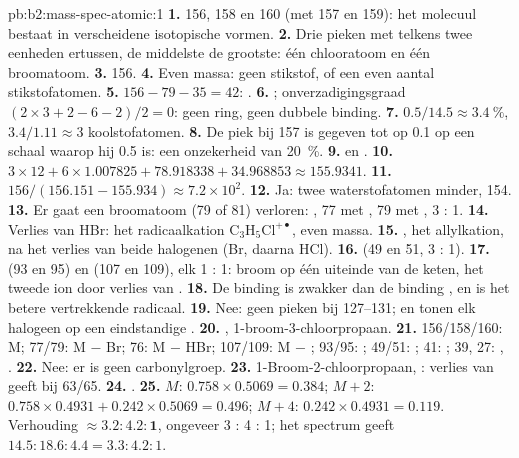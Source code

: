 \begin{solution}{pb:b2:mass-spec-atomic:1}
\textbf{1.} 156, 158 en 160 (met 157 en 159): het molecuul bestaat in verscheidene isotopische vormen.
\textbf{2.} Drie pieken met telkens twee eenheden ertussen, de middelste de grootste: één chlooratoom en één broomatoom.
\textbf{3.} 156.
\textbf{4.} Even massa: geen stikstof, of een even aantal stikstofatomen.
\textbf{5.} $156 - 79 - 35 = 42$: .
\textbf{6.} ; onverzadigingsgraad $(2 \times 3 + 2 - 6 - 2)/2 = 0$: geen ring, geen dubbele
binding.
\textbf{7.} $0.5/14.5 \approx 3.4~\%$, $3.4/1.11 \approx 3$ koolstofatomen.
\textbf{8.} De piek bij 157 is gegeven tot op 0.1 op een schaal waarop hij 0.5 is: een onzekerheid van 20~\%.
\textbf{9.}  en .
\textbf{10.} $3 \times 12 + 6 \times 1.007825 + 78.918338 + 34.968853 \approx 155.9341$.
\textbf{11.} $156/(156.151 - 155.934) \approx 7.2 \times 10^2$.
\textbf{12.} Ja: twee waterstofatomen minder, 154.
\textbf{13.} Er gaat een broomatoom (79 of 81) verloren: , 77 met , 79 met ,
3 : 1.
\textbf{14.} Verlies van HBr: het radicaalkation $\mathrm{C_3H_5Cl^{+\bullet}}$, even massa.
\textbf{15.} , het allylkation, na het verlies van beide halogenen (Br, daarna HCl).
\textbf{16.}  (49 en 51, 3 : 1).
\textbf{17.}  (93 en 95) en  (107 en 109), elk 1 : 1: broom op één uiteinde van
de keten, het tweede ion door verlies van .
\textbf{18.} De binding  is zwakker dan de binding , en  is het betere vertrekkende
radicaal.
\textbf{19.} Nee: geen pieken bij 127--131;  en  tonen elk halogeen op een eindstandige
.
\textbf{20.} , 1-broom-3-chloorpropaan.
\textbf{21.} 156/158/160: M; 77/79: M $-$ Br; 76: M $-$ HBr; 107/109: M $-$ ;
93/95: ; 49/51: ; 41: ; 39, 27: , .
\textbf{22.} Nee: er is geen carbonylgroep.
\textbf{23.} 1-Broom-2-chloorpropaan, : verlies van  geeft  bij 63/65.
\textbf{24.} .
\textbf{25.} $M$: $0.758 \times 0.5069 = 0.384$; $M+2$: $0.758 \times 0.4931 + 0.242 \times 0.5069 =
0.496$; $M+4$: $0.242 \times 0.4931 = 0.119$. Verhouding $\boldsymbol{\approx 3.2 : 4.2 : 1}$, ongeveer 3 : 4 :
1; het spectrum geeft $14.5 : 18.6 : 4.4 = 3.3 : 4.2 : 1$.
\end{solution}
